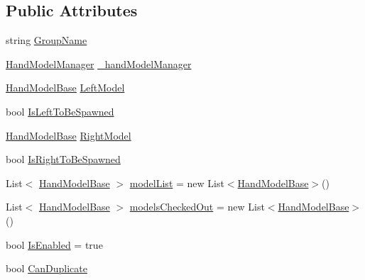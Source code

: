 \subsection*{Public Attributes}
\begin{DoxyCompactItemize}
\item 
string \mbox{\hyperlink{class_leap_1_1_unity_1_1_hand_model_manager_1_1_model_group_ab656d1b43ddccc13a1963a40a563c5ce}{Group\+Name}}
\item 
\mbox{\hyperlink{class_leap_1_1_unity_1_1_hand_model_manager}{Hand\+Model\+Manager}} \mbox{\hyperlink{class_leap_1_1_unity_1_1_hand_model_manager_1_1_model_group_a9d5316e304d9d93a94d3e2702530191f}{\+\_\+hand\+Model\+Manager}}
\item 
\mbox{\hyperlink{class_leap_1_1_unity_1_1_hand_model_base}{Hand\+Model\+Base}} \mbox{\hyperlink{class_leap_1_1_unity_1_1_hand_model_manager_1_1_model_group_a46323a7d0662325b7312c773d6cc1ec6}{Left\+Model}}
\item 
bool \mbox{\hyperlink{class_leap_1_1_unity_1_1_hand_model_manager_1_1_model_group_a86dbbaa10bbaba94e59d29eef1f110aa}{Is\+Left\+To\+Be\+Spawned}}
\item 
\mbox{\hyperlink{class_leap_1_1_unity_1_1_hand_model_base}{Hand\+Model\+Base}} \mbox{\hyperlink{class_leap_1_1_unity_1_1_hand_model_manager_1_1_model_group_a222ce0d3e9c3c9ac1ca33d282e187592}{Right\+Model}}
\item 
bool \mbox{\hyperlink{class_leap_1_1_unity_1_1_hand_model_manager_1_1_model_group_a3b6cab9d5e0f3f8b1eed720e422c3717}{Is\+Right\+To\+Be\+Spawned}}
\item 
List$<$ \mbox{\hyperlink{class_leap_1_1_unity_1_1_hand_model_base}{Hand\+Model\+Base}} $>$ \mbox{\hyperlink{class_leap_1_1_unity_1_1_hand_model_manager_1_1_model_group_a58982d1aa9bff823e176a1a3dce562a5}{model\+List}} = new List$<$\mbox{\hyperlink{class_leap_1_1_unity_1_1_hand_model_base}{Hand\+Model\+Base}}$>$()
\item 
List$<$ \mbox{\hyperlink{class_leap_1_1_unity_1_1_hand_model_base}{Hand\+Model\+Base}} $>$ \mbox{\hyperlink{class_leap_1_1_unity_1_1_hand_model_manager_1_1_model_group_a30b74658ecc666ac251dd85c10c51b1f}{models\+Checked\+Out}} = new List$<$\mbox{\hyperlink{class_leap_1_1_unity_1_1_hand_model_base}{Hand\+Model\+Base}}$>$()
\item 
bool \mbox{\hyperlink{class_leap_1_1_unity_1_1_hand_model_manager_1_1_model_group_a83a92f3e148bc006bbf67bc1a969eca3}{Is\+Enabled}} = true
\item 
bool \mbox{\hyperlink{class_leap_1_1_unity_1_1_hand_model_manager_1_1_model_group_af3e57d97bd8bb98261b15898fac671bb}{Can\+Duplicate}}
\end{DoxyCompactItemize}


